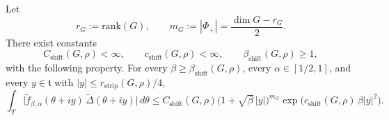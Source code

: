 \begin{lemma}\label{lem:A1_shifted_torus_integral}
Let
\[
r_G:=\mathrm{rank}(G),
\qquad
m_G:=|\Phi_+|=\frac{\dim G-r_G}{2}.
\]
There exist constants
\[
C_{\mathrm{shift}}(G,\rho)<\infty,
\qquad
c_{\mathrm{shift}}(G,\rho)<\infty,
\qquad
\beta_{\mathrm{shift}}(G,\rho)\ge 1,
\]
with the following property.
For every $\beta\ge \beta_{\mathrm{shift}}(G,\rho)$, every $\alpha\in[1/2,1]$, and every $y\in\mathfrak t$ with $|y|\le r_{\mathrm{strip}}(G,\rho)/4$,
\begin{equation}\label{eq:A1_shifted_torus_integral}
\int_T \bigl|\widetilde f_{\beta,\alpha}(\theta+iy)\,\widetilde\Delta(\theta+iy)\bigr|\,d\theta
\le
C_{\mathrm{shift}}(G,\rho)
\bigl(1+\sqrt\beta\,|y|\bigr)^{m_G}
\exp\!\bigl(c_{\mathrm{shift}}(G,\rho)\,\beta |y|^2\bigr).
\end{equation}
\end{lemma}

